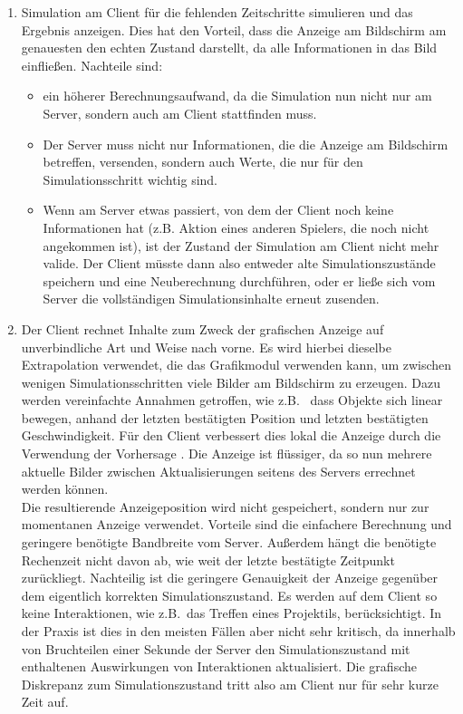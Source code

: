 \begin{enumerate}
\item Simulation am Client für die fehlenden Zeitschritte simulieren und das Ergebnis anzeigen. Dies hat den Vorteil, dass die Anzeige am Bildschirm am genauesten den echten Zustand darstellt, da alle Informationen in das Bild einfließen. Nachteile sind:
\begin{itemize}
 \item ein höherer Berechnungsaufwand, da die Simulation nun nicht nur am Server, sondern auch am Client stattfinden muss. 
 \item Der Server muss nicht nur Informationen, die die Anzeige am Bildschirm betreffen, versenden, sondern auch Werte, die nur für den Simulationsschritt wichtig sind.
 \item Wenn am Server etwas passiert, von dem der Client noch keine Informationen hat (z.B. Aktion eines anderen Spielers, die noch nicht angekommen ist), ist der Zustand der Simulation am Client nicht mehr valide. Der Client müsste dann also entweder alte Simulationszustände speichern und eine Neuberechnung durchführen, oder er ließe sich vom Server die vollständigen Simulationsinhalte erneut zusenden.
\end{itemize}
\item Der Client rechnet Inhalte zum Zweck der grafischen Anzeige auf unverbindliche Art und Weise nach vorne. Es wird hierbei dieselbe Extrapolation verwendet, die das Grafikmodul verwenden kann, um zwischen wenigen Simulationsschritten viele Bilder am Bildschirm zu erzeugen. Dazu werden vereinfachte Annahmen getroffen, wie z.B.~ dass Objekte sich linear bewegen, anhand der letzten bestätigten Position und letzten bestätigten Geschwindigkeit. Für den Client verbessert dies lokal die Anzeige durch die Verwendung der Vorhersage \cite[ch. 6.2.2]{gamenetworking00}. Die Anzeige ist flüssiger, da so nun mehrere aktuelle Bilder zwischen Aktualisierungen seitens des Servers errechnet werden können.\\
Die resultierende Anzeigeposition wird nicht gespeichert, sondern nur zur momentanen Anzeige verwendet.
Vorteile sind die einfachere Berechnung und geringere benötigte Bandbreite vom Server. Außerdem hängt die benötigte Rechenzeit nicht davon ab, wie weit der letzte bestätigte Zeitpunkt zurückliegt. 
Nachteilig ist die geringere Genauigkeit der Anzeige gegenüber dem eigentlich korrekten Simulationszustand. Es werden auf dem Client so keine Interaktionen, wie z.B.~das Treffen eines Projektils, berücksichtigt. 
In der Praxis ist dies in den meisten Fällen aber nicht sehr kritisch, da innerhalb von Bruchteilen einer Sekunde der Server den Simulationszustand mit enthaltenen Auswirkungen von Interaktionen aktualisiert. Die grafische Diskrepanz zum Simulationszustand tritt also am Client nur für sehr kurze Zeit auf.\\
\end{enumerate}
